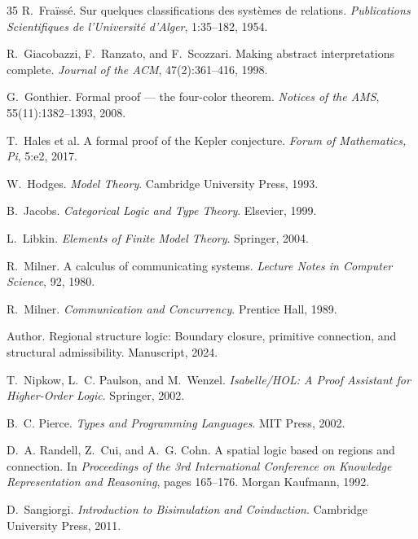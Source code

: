 \documentclass[12pt]{article}
\theoremstyle{plain}
\theoremstyle{definition}
\theoremstyle{remark}
\begin{document}
\begin{thebibliography}{35}
R.~Fra\"{i}ss\'{e}.
\newblock Sur quelques classifications des syst\`{e}mes de relations.
\newblock \emph{Publications Scientifiques de l'Universit\'{e} d'Alger},
  1:35--182, 1954.

R.~Giacobazzi, F.~Ranzato, and F.~Scozzari.
\newblock Making abstract interpretations complete.
\newblock \emph{Journal of the {ACM}}, 47(2):361--416, 1998.

G.~Gonthier.
\newblock Formal proof --- the four-color theorem.
\newblock \emph{Notices of the {AMS}}, 55(11):1382--1393, 2008.

T.~Hales et al.
\newblock A formal proof of the {Kepler} conjecture.
\newblock \emph{Forum of Mathematics, Pi}, 5:e2, 2017.

W.~Hodges.
\newblock \emph{Model Theory}.
\newblock Cambridge University Press, 1993.

B.~Jacobs.
\newblock \emph{Categorical Logic and Type Theory}.
\newblock Elsevier, 1999.

L.~Libkin.
\newblock \emph{Elements of Finite Model Theory}.
\newblock Springer, 2004.

R.~Milner.
\newblock A calculus of communicating systems.
\newblock \emph{Lecture Notes in Computer Science}, 92, 1980.

R.~Milner.
\newblock \emph{Communication and Concurrency}.
\newblock Prentice Hall, 1989.

Author.
\newblock Regional structure logic: Boundary closure, primitive connection, and
  structural admissibility.
\newblock Manuscript, 2024.

T.~Nipkow, L.~C. Paulson, and M.~Wenzel.
\newblock \emph{Isabelle/{HOL}: A Proof Assistant for Higher-Order Logic}.
\newblock Springer, 2002.

B.~C. Pierce.
\newblock \emph{Types and Programming Languages}.
\newblock MIT Press, 2002.

D.~A. Randell, Z.~Cui, and A.~G. Cohn.
\newblock A spatial logic based on regions and connection.
\newblock In \emph{Proceedings of the 3rd International Conference on
  Knowledge Representation and Reasoning}, pages 165--176.
  Morgan Kaufmann, 1992.

D.~Sangiorgi.
\newblock \emph{Introduction to Bisimulation and Coinduction}.
\newblock Cambridge University Press, 2011.


\end{thebibliography}
\end{document}
